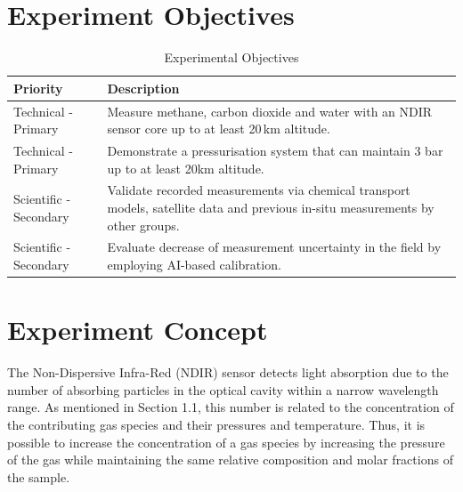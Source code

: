 \section{Experiment Objectives}

\begin{table}[H]
\centering
\caption{Experimental Objectives}
\label{tab:objectives}
\begin{tabularx}{0.9\textwidth}{lX}
\toprule
\textbf{Priority} & \textbf{Description} \\
\midrule
Technical - Primary & Measure methane, carbon dioxide and water with an NDIR sensor core up to at least 20\,km altitude.\\
Technical - Primary & Demonstrate a pressurisation system that can maintain 3 bar up to at least 20km altitude.\\
Scientific - Secondary & Validate recorded measurements via chemical transport models, satellite data and previous in-situ measurements by other groups.\\
Scientific - Secondary & Evaluate decrease of measurement uncertainty in the field by employing AI-based calibration.\\
\bottomrule
\end{tabularx}
\end{table}

\section{Experiment Concept}

The Non-Dispersive Infra-Red (NDIR) sensor detects light absorption due to the number of absorbing particles in the optical cavity within a narrow wavelength range.
As mentioned in Section 1.1, this number is related to the concentration of the contributing gas species and their pressures and temperature.
Thus, it is possible to increase the concentration of a gas species by increasing the pressure of the gas while maintaining the same relative composition and molar fractions of the sample.

